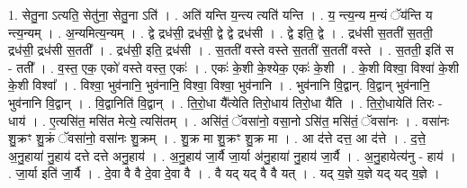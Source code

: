 \documentclass[17pt]{extarticle}
\begin{document}
1. सेतु॒ना ऽत्यति॒ सेतु॑ना॒ सेतु॒ना ऽति॑ । . अति॑ यन्ति य॒न्त्य त्यति॑ यन्ति । . य॒ न्त्य॒न्य म॒न्यं ॅय॑न्ति य न्त्य॒न्यम् । . अ॒न्यमित्य॒न्यम् । . द्वे द्रध॑सी॒ द्रध॑सी॒ द्वे द्वे द्रध॑सी । . द्वे इति॒ द्वे । . द्रध॑सी स॒तती॑ स॒तती॒ द्रध॑सी॒ द्रध॑सी स॒तती᳚ । . द्रध॑सी॒ इति॒ द्रध॑सी । . स॒तती॑ वस्ते वस्ते स॒तती॑ स॒तती॑ वस्ते । . स॒तती॒ इति॑ स - तती᳚ । . व॒स्त॒ एक॒ एको॑ वस्ते वस्त॒ एकः॑ । . एकः॑ के॒शी के॒श्येक॒ एकः॑ के॒शी । . के॒शी विश्वा॒ विश्वा॑ के॒शी के॒शी विश्वा᳚ । . विश्वा॒ भुव॑नानि॒ भुव॑नानि॒ विश्वा॒ विश्वा॒ भुव॑नानि । . भुव॑नानि वि॒द्वान्. वि॒द्वान् भुव॑नानि॒ भुव॑नानि वि॒द्वान् । . वि॒द्वानिति॑ वि॒द्वान् । . ति॒रो॒धा यै᳚त्येति तिरो॒धाय॑ तिरो॒धा यै॑ति । . ति॒रो॒धायेति॑ तिरः - धाय॑ । . ए॒त्यसि॑त॒ मसि॑त मेत्ये॒ त्यसि॑तम् । . असि॑तं॒ ॅवसा॑नो॒ वसा॒नो ऽसि॑त॒ मसि॑तं॒ ॅवसा॑नः । . वसा॑नः शु॒क्रꣳ शु॒क्रं ॅवसा॑नो॒ वसा॑नः शु॒क्रम् । . शु॒क्र मा शु॒क्रꣳ शु॒क्र मा । . आ द॑त्ते दत्त॒ आ द॑त्ते । . द॒त्ते॒ अ॒नु॒हाया॑ नु॒हाय॑ दत्ते दत्ते अनु॒हाय॑ । . अ॒नु॒हाय॑ जा॒र्यै जा॒र्या अ॑नु॒हाया॑ नु॒हाय॑ जा॒र्यै । . अ॒नु॒हायेत्य॑नु - हाय॑ । . जा॒र्या इति॑ जा॒र्यै । . दे॒वा वै वै दे॒वा दे॒वा वै । . वै यद् यद् वै वै यत् । . यद् य॒ज्ञे य॒ज्ञे यद् यद् य॒ज्ञे । \newline
\end{document}

